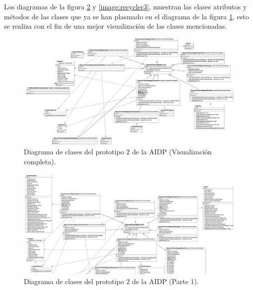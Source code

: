 \FloatBarrier
Los diagramas de la figura \ref{image:recycler2} y \ref{image:recycler3}, muestran las clases atributos y métodos de las clases que ya se han plasmado en el diagrama de la figura \ref{image:recycler1}, esto se realiza con el fin de una mejor visualización de las clases mencionadas.
\FloatBarrier
\begin{figure}[htbp!]
		\centering
			\includegraphics[width=1.1 \textwidth]{imagenes/aidp_clases/recycler1}
		\caption{Diagrama de clases del prototipo 2 de la AIDP (Visualización completa).}
		\label{image:recycler1}
\end{figure}
\FloatBarrier

\FloatBarrier
\begin{figure}[htbp!]
		\centering
			\includegraphics[width=1.1 \textwidth]{imagenes/aidp_clases/recycler2}
		\caption{Diagrama de clases del prototipo 2 de la AIDP (Parte 1).}
		\label{image:recycler2}
\end{figure}
\FloatBarrier

